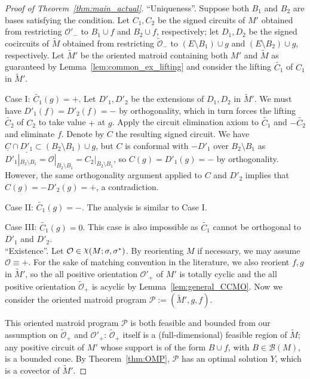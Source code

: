 \documentclass[12pt]{amsart}
\numberwithin{equation}{section}
\theoremstyle{definition}
\newcommand{\Bcal}{{\mathcal B}}
\newcommand{\Ocal}{{\mathcal O}}
\newcommand{\Pcal}{{\mathcal P}}
\DeclareRobustCommand{\rchi}{{\mathpalette\irchi\relax}}
\newcommand{\irchi}[2]{\raisebox{\depth}{$#1\chi$}}
\begin{document}
\begin{proof}[Proof of Theorem~\ref{thm:main_actual}]
``Uniqueness''. Suppose both $B_1$ and $B_2$ are bases satisfying the condition. Let $C_1,C_2$ be the signed circuits of $M'$ obtained from restricting $\Ocal'_-$ to $B_1\cup f$ and $B_2\cup f$, respectively; let $D_1,D_2$ be the signed cocircuits of $\widetilde{M}$ obtained from restricting $\widetilde{\Ocal}_-$ to $(E\setminus B_1)\cup g$ and $(E\setminus B_2)\cup g$, respectively. Let $\widetilde{M}'$ be the oriented matroid containing both $M'$ and $\widetilde{M}$ as guaranteed by Lemma~\ref{lem:common_ex_lifting} and consider the lifting $\widetilde{C_1}$ of $C_1$ in $\widetilde{M}'$.

Case I: $\widetilde{C_1}(g)=+$. Let $D'_1,D'_2$ be the extensions of $D_1,D_2$ in $\widetilde{M}'$. We must have $D'_1(f)=D'_2(f)=-$ by orthogonality, which in turn forces the lifting  $\widetilde{C_2}$ of $C_2$ to take value $+$ at $g$. Apply the circuit elimination axiom to $\widetilde{C_1}$ and $-\widetilde{C_2}$ and eliminate $f$. Denote by $C$ the resulting signed circuit. We have $\underline{C}\cap\underline{D'_1}\subset (B_2\setminus B_1)\cup g$, but $C$ is conformal with $-D'_1$ over $B_2\setminus B_1$ as $D'_1|_{B_2\setminus B_1}=\Ocal|_{B_2\setminus B_1}=C_2|_{B_2\setminus B_1}$, so $C(g)=D'_1(g)=-$ by orthogonality. However, the same orthogonality argument applied to $C$ and $D'_2$ implies that $C(g)=-D'_2(g)=+$, a contradiction.

Case II: $\widetilde{C_1}(g)=-$. The analysis is similar to Case I.

Case III: $\widetilde{C_1}(g)=0$. This case is also impossible as $\widetilde{C_1}$ cannot be orthogonal to $D'_1$ and $D'_2$.\\

``Existence''. Let $\Ocal\in\rchi(M;\sigma,\sigma^*)$. By reorienting $M$ if necessary, we may assume $\Ocal\equiv +$. For the sake of matching convention in the literature, we also reorient $f,g$ in $\widetilde{M}'$, so the all positive orientation $\Ocal'_+$ of $M'$ is totally cyclic and the all positive orientation $\widetilde{\Ocal}_+$ is acyclic by Lemma~\ref{lem:general_CCMO}. Now we consider the oriented matroid program $\Pcal:=(\widetilde{M}', g, f)$.

This oriented matroid program $\Pcal$ is both feasible and bounded from our assumption on $\widetilde{\Ocal}_+$ and $\Ocal'_+$: $\widetilde{\Ocal}_+$ itself is a (full-dimensional) feasible region of $\widetilde{M}$;
any positive circuit of $M'$ whose support is of the form $B\cup f$, with $ B\in\Bcal(M)$, is a bounded cone. %
By Theorem~\ref{thm:OMP}, $\Pcal$ has an optimal solution $Y$, which is a covector of $\widetilde{M}'$.


\end{proof}
\end{document}
